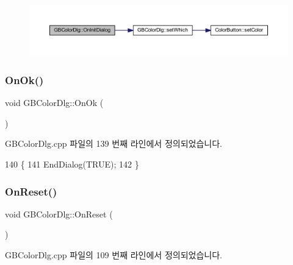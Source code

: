 \nopagebreak
\begin{figure}[H]
\begin{center}
\leavevmode
\includegraphics[width=350pt]{class_g_b_color_dlg_a376d61164a4ef4b8a60a0a3297e5470e_cgraph}
\end{center}
\end{figure}
\mbox{\label{class_g_b_color_dlg_a8e5665fcb4b77352198f77936b53190d}} 
\subsubsection{\texorpdfstring{On\+Ok()}{OnOk()}}
{\footnotesize\ttfamily void G\+B\+Color\+Dlg\+::\+On\+Ok (\begin{DoxyParamCaption}{ }\end{DoxyParamCaption})\hspace{0.3cm}{\ttfamily [protected]}}



G\+B\+Color\+Dlg.\+cpp 파일의 139 번째 라인에서 정의되었습니다.


\begin{DoxyCode}
140 \{
141   EndDialog(TRUE);
142 \}
\end{DoxyCode}
\mbox{\label{class_g_b_color_dlg_adab1ec84eb5ffdf0489cfe025d01ea7b}} 
\subsubsection{\texorpdfstring{On\+Reset()}{OnReset()}}
{\footnotesize\ttfamily void G\+B\+Color\+Dlg\+::\+On\+Reset (\begin{DoxyParamCaption}{ }\end{DoxyParamCaption})\hspace{0.3cm}{\ttfamily [protected]}}



G\+B\+Color\+Dlg.\+cpp 파일의 109 번째 라인에서 정의되었습니다.


